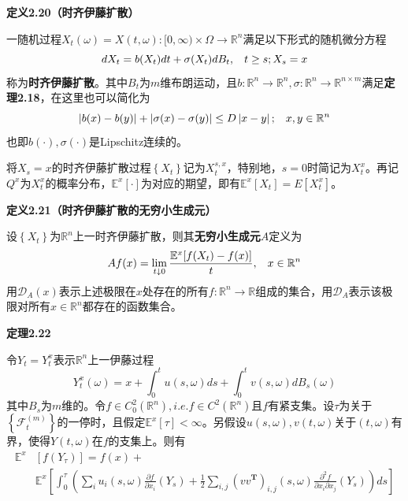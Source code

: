\documentclass[UTF8，12pt]{ctexart}
\numberwithin{equation}{section}
\begin{document}
\vspace{0.3cm}
\noindent \textbf{定义2.20（时齐伊藤扩散）}

一随机过程$X_t(\omega)=X(t,\omega):[0,\infty)\times\Omega\to\mathbb{R}^n$满足以下形式的随机微分方程
\[
dX_t=b(X_t)dt+\sigma(X_t)dB_t,\hspace{0.3cm}t\ge s;X_s=x
\]
称为\textbf{时齐伊藤扩散}。其中$B_t$为$m$维布朗运动，且$b:\mathbb{R}^n\to\mathbb{R}^n,\sigma:\mathbb{R}^n\to\mathbb{R}^{n\times m}$满足\textbf{定理2.18}，在这里也可以简化为
\[
\left\vert b(x)-b(y)\right\vert+\left\vert \sigma(x)-\sigma(y)\right\vert\le D\left\vert x-y\right\vert;\hspace{0.3cm}x,y\in\mathbb{R}^n
\]
也即$b(\cdot),\sigma(\cdot)$是Lipschitz连续的。

将$X_s=x$的时齐伊藤扩散过程$\left\{X_t\right\}$记为$X_t^{s,x}$，特别地，$s=0$时简记为$X_t^x$。再记$Q^x$为$X_t^x$的概率分布，$\mathbb{E}^x[\cdot]$为对应的期望，即有$\mathbb{E}^x[X_t]=E[X_t^x]$。

\vspace{0.3cm}
\noindent \textbf{定义2.21（时齐伊藤扩散的无穷小生成元）}

设$\left\{X_t\right\}$为$\mathbb{R}^n$上一时齐伊藤扩散，则其\textbf{无穷小生成元}$A$定义为
\[
Af(x)=\lim_{t\downarrow 0}\frac{\mathbb{E}^x[f(X_t)-f(x)]}{t},\hspace{0.3cm}x\in\mathbb{R}^n
\]
用$\mathcal{D}_A(x)$表示上述极限在$x$处存在的所有$f:\mathbb{R}^n\to\mathbb{R}$组成的集合，用$\mathcal{D}_A$表示该极限对所有$x\in\mathbb{R}^n$都存在的函数集合。

\vspace{0.3cm}
\noindent \textbf{定理2.22}

令$Y_t=Y_t^x$表示$\mathbb{R}^n$上一伊藤过程
\[
	Y_t^x(\omega)=x+\int_{0}^{t}u(s,\omega)ds+\int_{0}^{t}v(s,\omega)dB_s(\omega)
\]
其中$B_s$为$m$维的。令$f\in C_0^2(\mathbb{R}^n),i.e.f\in C^2(\mathbb{R}^n)$且$f$有紧支集。设$\tau$为关于$\left\{\mathcal{F}_t^{(m)}\right\}$的一停时，且假定$\mathbb{\mathbb{E}}^x[\tau]<\infty$。另假设$u(s,\omega),v(t,\omega)$关于$(t,\omega)$有界，使得$Y(t,\omega)$在$f$的支集上。则有
\[
	\begin{aligned}
		\mathbb{\mathbb{E}}^x&[f(Y_{\tau})]=f(x)+\\
								 &\mathbb{\mathbb{E}}^x\left[\int_{0}^{\tau}(\sum_i u_i(s,\omega)\frac{\partial f}{\partial x_i}(Y_s)+\frac{1}{2}\sum_{i,j}(vv^{\mathbf{T}})_{i,j}(s,\omega)\frac{\partial^2 f}{\partial x_i\partial x_j}(Y_s))ds\right]\\
	\end{aligned}
\]
\end{document}
